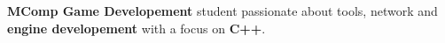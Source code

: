\noindent
\textbf{MComp Game Developement} student passionate about tools, network and \textbf{engine developement} with a focus on \textbf{C++}.
